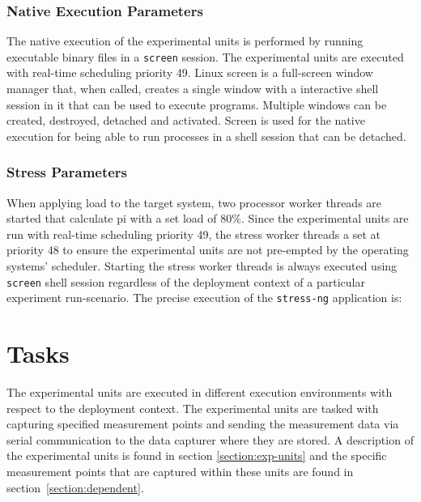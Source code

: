 \subsubsection{Native Execution Parameters} %
The native execution of the experimental units is performed by running executable binary files in a \texttt{screen} \cite{screen} session. The experimental units are executed with real-time scheduling priority 49. Linux screen is a full-screen window manager that, when called, creates a single window with a interactive shell session in it that can be used to execute programs. Multiple windows can be created, destroyed, detached and activated. Screen is used for the native execution for being able to run processes in a shell session that can be detached. 


\subsubsection{Stress Parameters}
When applying load to the target system, two processor worker threads are started that calculate pi with a set load of 80\%. Since the experimental units are run with real-time scheduling priority 49, the stress worker threads a set at priority 48 to ensure the experimental units are not pre-empted by the operating systems' scheduler. Starting the stress worker threads is always executed using \texttt{screen} shell session regardless of the deployment context of a particular experiment run-scenario. The precise execution of the \texttt{stress-ng} application is: \\

\begin{center}\end{center}



\section{Tasks}
The experimental units are executed in different execution environments with respect to the deployment context. The experimental units are tasked with capturing specified measurement points and sending the measurement data via serial communication to the data capturer where they are stored. A description of the experimental units is found in section \ref{section:exp-units} and the specific measurement points that are captured within these units are found in section~\ref{section:dependent}.


